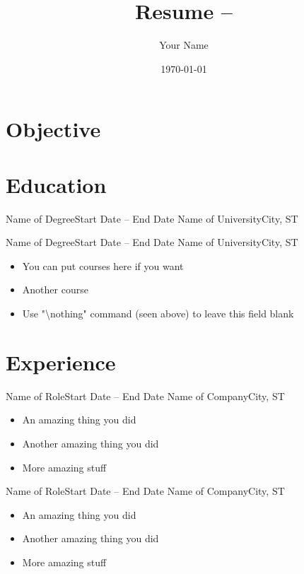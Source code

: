 \documentclass[english]{article}
\author{Your Name} %
\title{Resume -- \theauthor}
\date{\today} %
\begin{document}
\sffamily %
\maketitle


\section{Objective}



\section{Education}

\entry
{Name of Degree}{Start Date -- End Date}
{Name of University}{City, ST}
{\nothing}

\entry
{Name of Degree}{Start Date -- End Date}
{Name of University}{City, ST}
{
\begin{itemize}
\item You can put courses here if you want
\item Another course
\item Use "\textbackslash nothing" command (seen above) to leave this field blank
\end{itemize}
}


\section{Experience}

\entry
{Name of Role}{Start Date -- End Date}
{Name of Company}{City, ST}
{
\begin{itemize}
\item An amazing thing you did
\item Another amazing thing you did
\item More amazing stuff
\end{itemize}
}

\entry
{Name of Role}{Start Date -- End Date}
{Name of Company}{City, ST}
{
\begin{itemize}
\item An amazing thing you did
\item Another amazing thing you did
\item More amazing stuff
\end{itemize}
}
\end{document}
